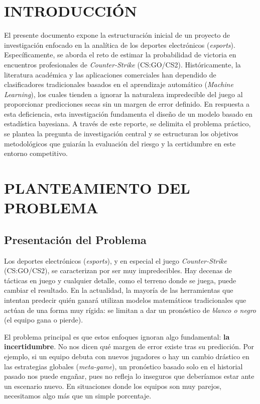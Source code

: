 \documentclass[twocolumn,10pt]{article}
\begin{document}
\thispagestyle{fancyplain} %


\section{INTRODUCCIÓN}

\justifying
El presente documento expone la estructuración inicial de un proyecto de investigación enfocado en la analítica de los deportes electrónicos (\textit{esports}). Específicamente, se aborda el reto de estimar la probabilidad de victoria en encuentros profesionales de \textit{Counter-Strike} (CS:GO/CS2). Históricamente, la literatura académica y las aplicaciones comerciales han dependido de clasificadores tradicionales basados en el aprendizaje automático (\textit{Machine Learning}), los cuales tienden a ignorar la naturaleza impredecible del juego al proporcionar predicciones secas sin un margen de error definido. En respuesta a esta deficiencia, esta investigación fundamenta el diseño de un modelo basado en estadística bayesiana. A través de este reporte, se delimita el problema práctico, se plantea la pregunta de investigación central y se estructuran los objetivos metodológicos que guiarán la evaluación del riesgo y la certidumbre en este entorno competitivo.

\section{PLANTEAMIENTO DEL PROBLEMA}

\subsection{Presentación del Problema}

Los deportes electrónicos (\textit{esports}), y en especial el juego \textit{Counter-Strike} (CS:GO/CS2), se caracterizan por ser muy impredecibles. Hay decenas de tácticas en juego y cualquier detalle, como el terreno donde se juega, puede cambiar el resultado. En la actualidad, la mayoría de las herramientas que intentan predecir quién ganará utilizan modelos matemáticos tradicionales que actúan de una forma muy rígida: se limitan a dar un pronóstico de \textit{blanco o negro} (el equipo gana o pierde).

El problema principal es que estos enfoques ignoran algo fundamental: \textbf{la incertidumbre}. No nos dicen qué margen de error existe tras su predicción. Por ejemplo, si un equipo debuta con nuevos jugadores o hay un cambio drástico en las estrategias globales (\textit{meta-game}), un pronóstico basado solo en el historial pasado nos puede engañar, pues no refleja lo inseguros que deberíamos estar ante un escenario nuevo. En situaciones donde los equipos son muy parejos, necesitamos algo más que un simple porcentaje.
\end{document}
